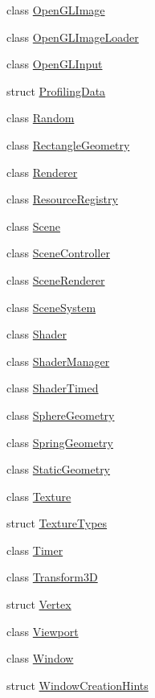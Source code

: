 \begin{DoxyCompactItemize}
class \mbox{\hyperlink{classec_1_1_open_g_l_image}{Open\+G\+L\+Image}}
\item 
class \mbox{\hyperlink{classec_1_1_open_g_l_image_loader}{Open\+G\+L\+Image\+Loader}}
\item 
class \mbox{\hyperlink{classec_1_1_open_g_l_input}{Open\+G\+L\+Input}}
\item 
struct \mbox{\hyperlink{structec_1_1_profiling_data}{Profiling\+Data}}
\item 
class \mbox{\hyperlink{classec_1_1_random}{Random}}
\item 
class \mbox{\hyperlink{classec_1_1_rectangle_geometry}{Rectangle\+Geometry}}
\item 
class \mbox{\hyperlink{classec_1_1_renderer}{Renderer}}
\item 
class \mbox{\hyperlink{classec_1_1_resource_registry}{Resource\+Registry}}
\item 
class \mbox{\hyperlink{classec_1_1_scene}{Scene}}
\item 
class \mbox{\hyperlink{classec_1_1_scene_controller}{Scene\+Controller}}
\item 
class \mbox{\hyperlink{classec_1_1_scene_renderer}{Scene\+Renderer}}
\item 
class \mbox{\hyperlink{classec_1_1_scene_system}{Scene\+System}}
\item 
class \mbox{\hyperlink{classec_1_1_shader}{Shader}}
\item 
class \mbox{\hyperlink{classec_1_1_shader_manager}{Shader\+Manager}}
\item 
class \mbox{\hyperlink{classec_1_1_shader_timed}{Shader\+Timed}}
\item 
class \mbox{\hyperlink{classec_1_1_sphere_geometry}{Sphere\+Geometry}}
\item 
class \mbox{\hyperlink{classec_1_1_spring_geometry}{Spring\+Geometry}}
\item 
class \mbox{\hyperlink{classec_1_1_static_geometry}{Static\+Geometry}}
\item 
class \mbox{\hyperlink{classec_1_1_texture}{Texture}}
\item 
struct \mbox{\hyperlink{structec_1_1_texture_types}{Texture\+Types}}
\item 
class \mbox{\hyperlink{classec_1_1_timer}{Timer}}
\item 
class \mbox{\hyperlink{classec_1_1_transform3_d}{Transform3D}}
\item 
struct \mbox{\hyperlink{structec_1_1_vertex}{Vertex}}
\item 
class \mbox{\hyperlink{classec_1_1_viewport}{Viewport}}
\item 
class \mbox{\hyperlink{classec_1_1_window}{Window}}
\item 
struct \mbox{\hyperlink{structec_1_1_window_creation_hints}{Window\+Creation\+Hints}}
\end{DoxyCompactItemize}
